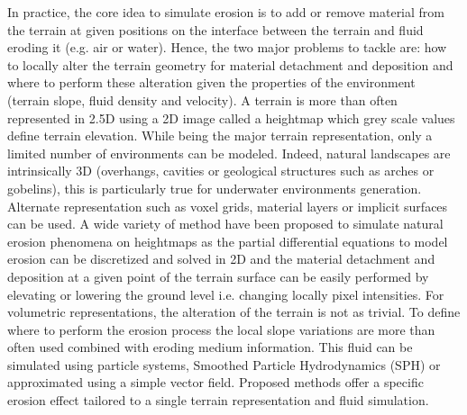 In practice, the core idea to simulate erosion is to add or remove material from the terrain at given positions on the interface between the terrain and fluid eroding it (e.g. air or water). Hence, the two major problems to tackle are: how to locally alter the terrain geometry for material detachment and deposition and where to perform these alteration given the properties of the environment (terrain slope, fluid density and velocity).
A terrain is more than often represented in 2.5D using a 2D image called a heightmap which grey scale values define terrain elevation. While being the major terrain representation, only a limited number of environments can be modeled. Indeed, natural landscapes are intrinsically 3D (overhangs, cavities or geological structures such as arches or gobelins), this is particularly true for underwater environments generation. Alternate representation such as voxel grids, material layers or implicit surfaces can be used. A wide variety of method have been proposed to simulate natural erosion phenomena on heightmaps as the partial differential equations to model erosion can be discretized and solved in 2D and the material detachment and deposition at a given point of the terrain surface can be easily performed by elevating or lowering the ground level i.e. changing locally pixel intensities. 
For volumetric representations, the alteration of the terrain is not as trivial.
To define where to perform the erosion process the local slope variations are more than often used combined with eroding medium information. This fluid can be simulated using particle systems, Smoothed Particle Hydrodynamics (SPH) \cite{Kristof2009} or approximated using a simple vector field. 
Proposed methods offer a specific erosion effect tailored to a single terrain representation and fluid simulation.

